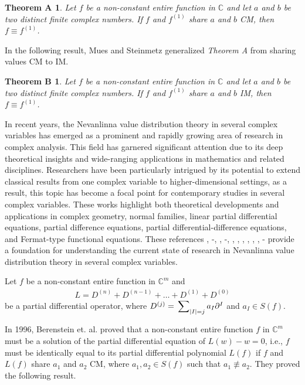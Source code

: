 \documentclass[11pt, reqno]{amsart}
\newtheorem*{theoA}{Theorem A}
\newtheorem*{theoB}{Theorem B}
\numberwithin{equation}{section}
\begin{document}
\begin{theoA}\cite{Rubel-Yang} Let $f$ be a non-constant entire function in $\mathbb{C}$ and let $a$ and $b$ be two distinct finite complex numbers. If $f$ and $f^{(1)}$ share $a$ and $b$ CM, then $f\equiv f^{(1)}$.
\end{theoA} 

In the following result, Mues and Steinmetz \cite{Mues-Steinmetz} generalized \emph{Theorem A} from sharing values CM to IM.

\begin{theoB}\cite{Mues-Steinmetz} Let $f$ be a non-constant entire function in $\mathbb{C}$ and let $a$ and $b$ be two distinct finite complex numbers. If $f$ and $f^{(1)}$ share $a$ and $b$ IM, then $f\equiv f^{(1)}$.
\end{theoB}

\smallskip
In recent years, the Nevanlinna value distribution theory in several complex variables has emerged as a prominent and rapidly growing area of research in complex analysis. This field has garnered significant attention due to its deep theoretical insights and wide-ranging applications in mathematics and related disciplines. Researchers have been particularly intrigued by its potential to extend classical results from one complex variable to higher-dimensional settings, as a result, this topic has become a focal point for contemporary studies in several complex variables. These works highlight both theoretical developments and applications in complex geometry, normal families, linear partial differential equations, partial difference equations, partial differential-difference equations, and Fermat-type functional equations. These references \cite{BM1}, \cite{Berenstein-Chang-Li}-\cite{HZ1}, \cite{Hu-Yang-2014}, \cite{IM}-\cite{LZ}, \cite{MD1}, \cite{MDP}, \cite{MS}, \cite{MS1}, \cite{MSP}, \cite{GS2}, \cite{XC1}- \cite{XW1} provide a foundation for understanding the current state of research in Nevanlinna value distribution theory in several complex variables.

Let $f$ be a non-constant entire function in $\mathbb{C}^m$ and 
\begin{align}\label{do2} 
L=D^{(n)}+D^{(n-1)}+\ldots+D^{(1)}+D^{(0)}
\end{align}
be a partial differential operator, where
$D^{(j)}=\sideset{}{_{|I|=j}}{\sum} a_I\partial^{I}$ and $a_I\in S(f)$.


In 1996, Berenstein et. al. \cite{Berenstein-Chang-Li} proved that a non-constant entire function $f$ in $\mathbb{C}^m$ must be a solution of the partial differential equation of $L(w)-w=0$, i.e., $f$ must be identically equal to its partial differential polynomial $L(f)$ if $f$ and $L(f)$ share $a_1$ and $a_2$ CM, where $a_1, a_2\in S(f)$ such that $a_1\not\equiv a_2$. They proved the following result.
\end{document}
